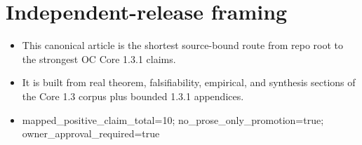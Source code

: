 \section*{Independent-release framing}
\begin{itemize}[leftmargin=*]
\item This canonical article is the shortest source-bound route from repo root to the strongest OC Core 1.3.1 claims.
\item It is built from real theorem, falsifiability, empirical, and synthesis sections of the Core 1.3 corpus plus bounded 1.3.1 appendices.
\item mapped\_positive\_claim\_total=10; no\_prose\_only\_promotion=true; owner\_approval\_required=true
\end{itemize}
